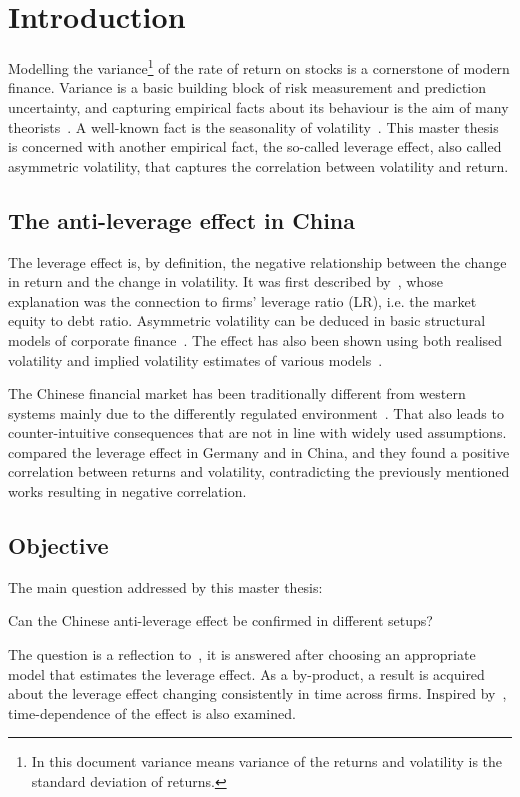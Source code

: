 \section{Introduction}

Modelling the variance\footnote{In this document variance means variance of the returns and volatility is the standard deviation of returns.} of the rate of return on stocks is a cornerstone of modern finance.
Variance is a basic building block of risk measurement and prediction uncertainty, and capturing empirical facts about its behaviour is the aim of many theorists~\citep{Christie1982}.
A well-known fact is the seasonality of volatility~\citep{schwert1989why}.
This master thesis is concerned with another empirical fact, the so-called leverage effect, also called asymmetric volatility, that captures the correlation between volatility and return.

\subsection{The anti-leverage effect in China}

The leverage effect is, by definition, the negative relationship between the change in return and the change in volatility.
It was first described by~\citet{black1976studies}, whose explanation was the connection to firms' leverage ratio (LR), i.e. the market equity to debt ratio.
Asymmetric volatility can be deduced in basic structural models of corporate finance~\citep{Christie1982}.
The effect has also been shown using both realised volatility and implied volatility estimates of various models~\citep{Bouchaud2001,Harvey1996,Christie1982,french1987expected}.

The Chinese financial market has been traditionally different from western systems mainly due to the differently regulated environment~\citep{GORDON2003}.
That also leads to counter-intuitive consequences that are not in line with widely used assumptions.
\citet{Shen2009} compared the leverage effect in Germany and in China, and they found a positive correlation between returns and volatility, contradicting the previously mentioned works resulting in negative correlation.


\subsection{Objective}

The main question addressed by this master thesis:
\begin{center}
	Can the Chinese anti-leverage effect be confirmed in different setups?
\end{center}
The question is a reflection to~\citet{Shen2009}, it is answered after choosing an appropriate model that estimates the leverage effect.
As a by-product, a result is acquired about the leverage effect changing consistently in time across firms.
Inspired by~\citet{christensen2015impact}, time-dependence of the effect is also examined.
